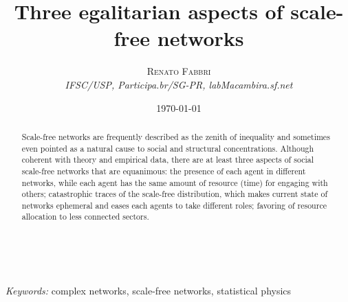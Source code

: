 \documentclass[a4paper, 11pt]{article} %
\title{\textbf{Three egalitarian aspects of scale-free networks}\\ %
} %
\author{\textsc{Renato Fabbri} %
\\{\textit{IFSC/USP, Participa.br/SG-PR, labMacambira.sf.net}}} %
\date{\today} %
\makeatletter
\renewcommand{\maketitle}{ %
\begin{flushright} %
{\LARGE\@title} %

\vspace{50pt} %

{\large\@author} %
\\\@date %

\vspace{40pt} %
\end{flushright}
}
\makeatother
\begin{document}
\maketitle %




\begin{abstract}
Scale-free networks are frequently described as the zenith of inequality and sometimes even pointed as a natural cause to social and structural concentrations. Although coherent with theory and empirical data, there are at least three aspects of social scale-free networks that are equanimous: the presence of each agent in different networks, while each agent has the same amount of resource (time) for engaging with others; catastrophic traces of the scale-free distribution, which makes current state of networks ephemeral and eases each agents to take different roles; favoring of resource allocation to less connected sectors.
\end{abstract}

%

\hspace*{3,6mm}\textit{Keywords:} complex networks, scale-free networks, statistical physics %


\newpage
\tableofcontents
\end{document}
